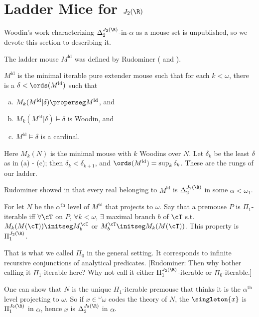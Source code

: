\documentclass[oneside,12pt]{amsart}
\begin{document}
\section{Ladder Mice for $J_2(\R)$}

Woodin's work characterizing $\Delta_2^{J_2(\R)}$-in-$\alpha$ as a mouse set is
unpublished, so we devote this section to describing it.

The ladder mouse $M^{\text{ld}}$ was defined by Rudominer
(\cite{My_Thesis} and \cite{Mouse_Sets} ).

\begin{definition}
$M^{\text{ld}}$ is the minimal iterable pure extender mouse such that for each $k<\omega$,
 there is a $\delta<\ords(M^{\text{ld}})$ such that
\begin{enumerate}[(a)]
\item $M_k(M^{\text{ld}} \vert \delta) \properseg M^{\text{ld}} $, and
\item $M_k(M^{\text{ld}} \vert \delta) \models \delta$ is Woodin, and
\item $M^{\text{ld}} \models \delta$ is a cardinal.
\end{enumerate}

Here $M_k(N)$ is the minimal mouse with $k$ Woodins over $N$. Let $\delta_k$
be the least $\delta$ as in (a) - (c); then $\delta_k<\delta_{k+1}$, and
$\ords(M^{\text{ld}}) = \sup_k \delta_k$. These are the rungs of our ladder.

\end{definition}

Rudominer showed in \cite{My_Thesis} that every real belonging to
$M^{\text{ld}}$ is $\Delta_2^{J_2(\R)}$ in some $\alpha<\omega_1$.

For let $N$ be the $\alpha^{\text{th}}$ level of $M^{\text{ld}}$ that projects to
$\omega$. Say that a premouse $P$ is  $\Pi_1$-iterable iff $\forall \cT$ on $P$,
$\forall k < \omega$,  $\exists$ maximal branch $b$ of
$\cT$ s.t. $ M_k(M(\cT))\initseg M_b^{\cT}$ or $M_b^{\cT}\initseg M_k(M(\cT))$.
This property is $\Pi_1^{J_2(\R)}$.

\begin{aside}
That is what we called $\Pi_0$ in the general setting. It corresponds to infinite recursive
conjunctions of analytical predicates. [Rudominer: Then why bother calling
it $\Pi_1$-iterable here? Why not call it either $\Pi_1^{J_2(\R)}$-iterable
or $\Pi_0$-iterable.]
\end{aside}

One can show that $N$ is the unique $\Pi_1$-iterable premouse that thinks it is
the $\alpha^{\text{th}}$ level projecting to $\omega$. So if $x\in{}^{\omega}\omega$
codes the theory of $N$, the $\singleton{x}$ is $\Pi_1^{J_2(\R)}$ in $\alpha$,
hence $x$ is $\Delta_2^{J_2(\R)}$ in $\alpha$.
\end{document}
